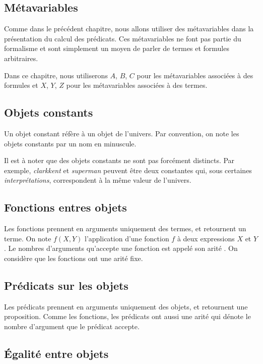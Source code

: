 \subsection{Métavariables}

Comme dans le précédent chapitre, nous allons utiliser des métavariables dans la présentation du calcul des prédicats.
Ces métavariables ne font pas partie du formalisme et sont simplement un moyen de parler de termes et formules arbitraires.

Dans ce chapitre, nous utiliserons $A$, $B$, $C$ pour les métavariables associées à des formules et $X$, $Y$, $Z$ pour les métavariables associées à des termes.

\subsection{Objets constants}

Un objet constant réfère à un objet de l'univers. Par convention, on note les objets constants par un nom en minuscule.

Il est à noter que des objets constants ne sont pas forcément distincts.
Par exemple, \textit{clarkkent} et \textit{superman} peuvent être deux constantes qui, sous certaines \textit{interprétations}, correspondent à la même valeur de l'univers.

\subsection{Fonctions entres objets}

Les fonctions prennent en arguments uniquement des termes, et retournent un terme.
On note $f(X, Y)$ l'application d'une fonction $f$ à deux expressions $X$ et $Y$.
Le nombres d'arguments qu'accepte une fonction est appelé son \og arité \fg{}.
On considère que les fonctions ont une arité fixe.

\subsection{Prédicats sur les objets}

Les prédicats prennent en arguments uniquement des objets, et retournent une proposition.
Comme les fonctions, les prédicats ont aussi une arité qui dénote le nombre d'argument que le prédicat accepte.

\subsection{Égalité entre objets}


